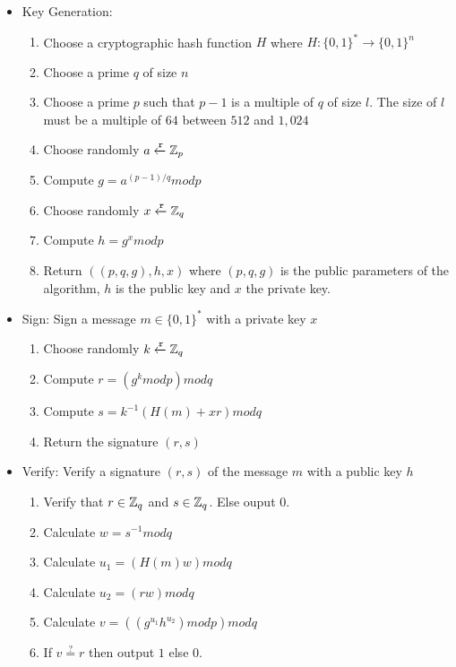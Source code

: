 \begin{itemize}
  \item Key Generation:
    \begin{enumerate}
      \item Choose a cryptographic hash function $H$ where $H: \{0, 1\}^{*} \rightarrow \{0, 1\}^{n}$
      \item Choose a prime $q$ of size $n$
      \item Choose a prime $p$ such that $p - 1$ is a multiple of $q$ of size $l$. The size of $l$ must be a multiple of $64$ between $512$ and $1,024$
      \item Choose randomly $a \xleftarrow{\mathtt{r}}{\mathbb{Z}_p}$
      \item Compute $g = a^{(p - 1)/q} mod p$
      \item Choose randomly $x \xleftarrow{\mathtt{r}}{\mathbb{Z}_q}$
      \item Compute $h = g^{x} modp$
      \item Return $((p, q, g), h, x)$ where $(p, q, g)$ is the public parameters of the algorithm, $h$ is the public key and $x$ the private key.
    \end{enumerate}
  \item Sign: Sign a message $m \in \{0, 1\}^{*}$ with a private key $x$
    \begin{enumerate}
      \item Choose randomly $k \xleftarrow{\mathtt{r}}{\mathbb{Z}_q}$
      \item Compute $r = (g^{k}modp)modq$
      \item Compute $s = k^{-1}(H(m) + xr) modq$
      \item Return the signature $(r, s)$
    \end{enumerate}
  \item Verify: Verify a signature $(r, s)$ of the message $m$ with a public key $h$
    \begin{enumerate}
      \item Verify that $r \in \mathbb{Z}_q$ and $s \in \mathbb{Z}_q$. Else ouput $0$.
      \item Calculate $w = s^{-1}modq$
      \item Calculate $u_1 = (H(m)w)modq$
      \item Calculate $u_2 = (rw)modq$
      \item Calculate $v = ((g^{u_1}h^{u_2})modp)modq$
      \item If $v \stackrel{?}{=} r$ then output $1$ else $0$.
    \end{enumerate}
\end{itemize}

